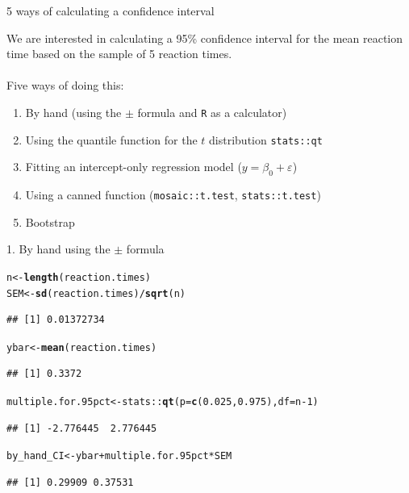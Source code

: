 \documentclass[10pt]{beamer}\usepackage[]{graphicx}\usepackage[]{color}
\makeatletter
\newcommand{\hlnum}[1]{\textcolor[rgb]{0.686,0.059,0.569}{#1}}%
\newcommand{\hlopt}[1]{\textcolor[rgb]{0,0,0}{#1}}%
\newcommand{\hlstd}[1]{\textcolor[rgb]{0.345,0.345,0.345}{#1}}%
\newcommand{\hlkwb}[1]{\textcolor[rgb]{0.69,0.353,0.396}{#1}}%
\newcommand{\hlkwc}[1]{\textcolor[rgb]{0.333,0.667,0.333}{#1}}%
\newcommand{\hlkwd}[1]{\textcolor[rgb]{0.737,0.353,0.396}{\textbf{#1}}}%
\newenvironment{kframe}{%
 \def\at@end@of@kframe{}%
 \ifinner\ifhmode%
  \def\at@end@of@kframe{\end{minipage}}%
  \begin{minipage}{\columnwidth}%
 \fi\fi%
 \def\FrameCommand##1{\hskip\@totalleftmargin \hskip-\fboxsep
 \colorbox{shadecolor}{##1}\hskip-\fboxsep
     \hskip-\linewidth \hskip-\@totalleftmargin \hskip\columnwidth}%
 \MakeFramed {\advance\hsize-\width
   \@totalleftmargin\z@ \linewidth\hsize
   \@setminipage}}%
 {\par\unskip\endMakeFramed%
 \at@end@of@kframe}
\newenvironment{knitrout}{}{} %
\makeatother
\begin{document}
\begin{frame}[fragile]{5 ways of calculating a confidence interval}
	
	We are interested in calculating a 95\% confidence interval for the mean reaction time based on the sample of 5 reaction times. \\ \ \\
	\pause
	Five ways of doing this:
	\begin{enumerate}
		\setlength\itemsep{1em}
		\item By hand (using the $\pm$ formula and \texttt{R} as a calculator)
		\item Using the quantile function for the $t$ distribution \texttt{stats::qt}
		\item Fitting an intercept-only regression model ($y = \beta_0 + \varepsilon$)
		\item Using a canned function (\texttt{mosaic::t.test}, \texttt{stats::t.test})
		\item Bootstrap
	\end{enumerate}
	
\end{frame}

\begin{frame}[fragile]{1. By hand using the $\pm$ formula}
\begin{knitrout}\tiny
{}\color{fgcolor}\begin{kframe}
\begin{alltt}
\hlstd{n} \hlkwb{<-} \hlkwd{length}\hlstd{(reaction.times)}
\hlstd{SEM} \hlkwb{<-} \hlkwd{sd}\hlstd{(reaction.times)}\hlopt{/}\hlkwd{sqrt}\hlstd{(n)}
\end{alltt}
\begin{verbatim}
## [1] 0.01372734
\end{verbatim}
\begin{alltt}
\hlstd{ybar} \hlkwb{<-} \hlkwd{mean}\hlstd{(reaction.times)}
\end{alltt}
\begin{verbatim}
## [1] 0.3372
\end{verbatim}
\begin{alltt}
\hlstd{multiple.for.95pct} \hlkwb{<-} \hlstd{stats}\hlopt{::}\hlkwd{qt}\hlstd{(}\hlkwc{p} \hlstd{=} \hlkwd{c}\hlstd{(}\hlnum{0.025}\hlstd{,} \hlnum{0.975}\hlstd{),} \hlkwc{df} \hlstd{= n}\hlopt{-}\hlnum{1}\hlstd{)}
\end{alltt}
\begin{verbatim}
## [1] -2.776445  2.776445
\end{verbatim}
\begin{alltt}
\hlstd{by_hand_CI} \hlkwb{<-} \hlstd{ybar} \hlopt{+} \hlstd{multiple.for.95pct} \hlopt{*} \hlstd{SEM}
\end{alltt}
\begin{verbatim}
## [1] 0.29909 0.37531
\end{verbatim}
\end{kframe}
\end{knitrout}
\end{frame}
\end{document}
